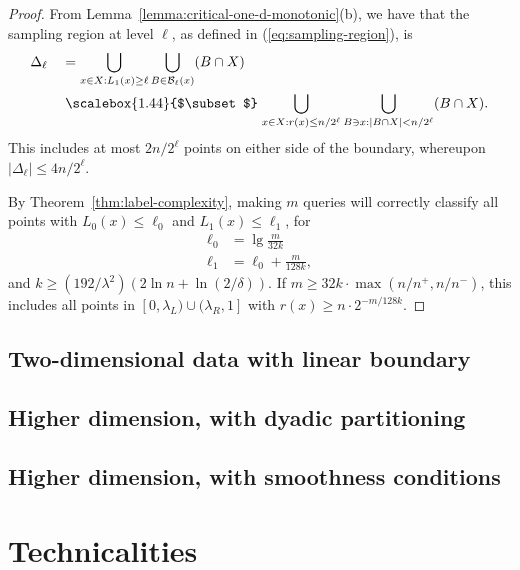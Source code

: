 \documentclass[anon,12pt]{colt2022} %
\def\B{{\mathcal B}}
\newcommand\bigsubset[1][1.19]{%
   \mathrel{\vcenter{\hbox{\scalebox{#1}{$\subset$}}}}}
\begin{document}
\begin{proof}
From Lemma~\ref{lemma:critical-one-d-monotonic}(b), we have that the sampling region at level $\ell$, as defined in (\ref{eq:sampling-region}), is
\begin{align*}
\Delta_\ell \ \ \ 
&= \bigcup_{x \in X: L_1(x) \geq \ell} \bigcup_{B \in \B_{\ell}(x)} (B \cap X) \\
&\bigsubset[1.44] \bigcup_{x \in X: r(x) \leq n/2^\ell} \bigcup_{B \ni x: |B \cap X| < n/2^\ell} (B \cap X) 
.
\end{align*}
This includes at most $2n/2^{\ell}$ points on either side of the boundary, whereupon $|\Delta_\ell| \leq 4n/2^{\ell}$.

By Theorem~\ref{thm:label-complexity}, making $m$ queries will correctly classify all points with $L_0(x) \leq \ell_0$ and $L_1(x) \leq \ell_1$, for
\begin{align*}
\ell_0
&= 
\lg \frac{m}{32k} \\
\ell_1
&=
\ell_0 + \frac{m}{128 k},
\end{align*}
and $k \geq (192/\lambda^2)(2 \ln n + \ln (2/\delta))$. If $m \geq 32k \cdot \max(n/n^+, n/n^-)$, this includes all points in $[0,\lambda_L) \cup (\lambda_R,1]$ with $r(x) \geq n \cdot 2^{-m/128k}$. 
\end{proof}

\subsection{Two-dimensional data with linear boundary}

\subsection{Higher dimension, with dyadic partitioning}

\subsection{Higher dimension, with smoothness conditions}





\vfill

\pagebreak

\appendix

\section{Technicalities}
\end{document}
